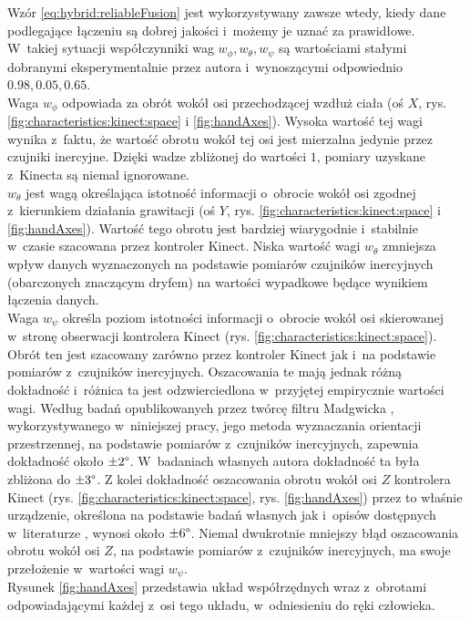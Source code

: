 Wzór \ref{eq:hybrid:reliableFusion} jest wykorzystywany zawsze wtedy, kiedy dane podlegające łączeniu są dobrej jakości i~możemy je uznać za prawidłowe. W~takiej sytuacji współczynniki wag $w_\phi , w_\theta , w_\psi$ są wartościami stałymi dobranymi eksperymentalnie przez autora i~wynoszącymi odpowiednio $0.98,0.05,0.65$.\\
Waga $w_\phi$ odpowiada za obrót wokół osi przechodzącej wzdłuż ciała (oś $X$, rys. \ref{fig:characteristics:kinect:space} i \ref{fig:handAxes}). Wysoka wartość tej wagi wynika z~faktu, że wartość obrotu wokół tej osi jest mierzalna jedynie przez czujniki inercyjne. Dzięki wadze zbliżonej do wartości $1$, pomiary uzyskane z~Kinecta są niemal ignorowane.\\
$w_\theta$ jest wagą określająca istotność informacji o~obrocie wokół osi zgodnej z~kierunkiem działania grawitacji (oś $Y$, rys. \ref{fig:characteristics:kinect:space} i \ref{fig:handAxes}). Wartość tego obrotu jest bardziej wiarygodnie i~stabilnie w~czasie szacowana przez kontroler Kinect. Niska wartość wagi $w_\theta$ zmniejsza wpływ danych wyznaczonych na podstawie pomiarów czujników inercyjnych (obarczonych znaczącym dryfem) na wartości wypadkowe będące wynikiem łączenia danych.\\ 
Waga $w_\psi$ określa poziom istotności informacji o~obrocie wokół osi skierowanej w~stronę obserwacji kontrolera Kinect (rys. \ref{fig:characteristics:kinect:space}). Obrót ten jest szacowany zarówno przez kontroler Kinect jak i~na podstawie pomiarów z~czujników inercyjnych. Oszacowania te mają jednak różną dokładność i~różnica ta jest odzwierciedlona w~przyjętej empirycznie wartości wagi. Według badań opublikowanych przez twórcę filtru Madgwicka \cite{Madgwick2010}, wykorzystywanego w~niniejszej pracy, jego metoda wyznaczania orientacji przestrzennej, na podstawie pomiarów z~czujników inercyjnych, zapewnia dokładność około $\pm2\degree$. W~badaniach własnych autora dokładność ta była zbliżona do $\pm3\degree$. Z kolei dokładność oszacowania obrotu wokół osi $Z$ kontrolera Kinect (rys. \ref{fig:characteristics:kinect:space}, rys. \ref{fig:handAxes}) przez to właśnie urządzenie, określona na podstawie badań własnych jak i~opisów dostępnych w~literaturze \cite{Huber2015}, wynosi około $\pm6\degree$. Niemal dwukrotnie mniejszy błąd oszacowania obrotu wokół osi $Z$, na podstawie pomiarów z~czujników inercyjnych, ma swoje przełożenie w~wartości wagi $w_\psi$.\\
Rysunek \ref{fig:handAxes} przedstawia układ współrzędnych wraz z~obrotami odpowiadającymi każdej z~osi tego układu, w~odniesieniu do ręki człowieka.
										
